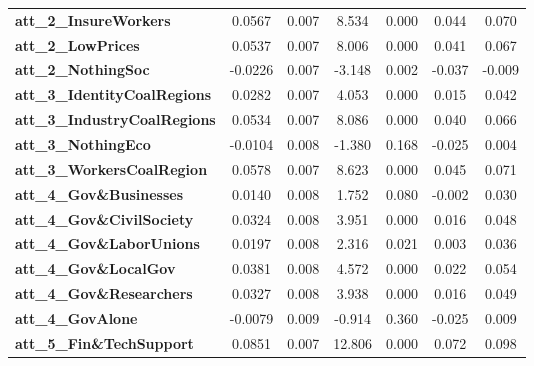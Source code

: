 \begin{center}
\begin{tabular}{lcccccc}
\textbf{att\_2\_InsureWorkers}       &       0.0567  &        0.007     &     8.534  &         0.000        &        0.044    &        0.070     \\
\textbf{att\_2\_LowPrices}           &       0.0537  &        0.007     &     8.006  &         0.000        &        0.041    &        0.067     \\
\textbf{att\_2\_NothingSoc}          &      -0.0226  &        0.007     &    -3.148  &         0.002        &       -0.037    &       -0.009     \\
\textbf{att\_3\_IdentityCoalRegions} &       0.0282  &        0.007     &     4.053  &         0.000        &        0.015    &        0.042     \\
\textbf{att\_3\_IndustryCoalRegions} &       0.0534  &        0.007     &     8.086  &         0.000        &        0.040    &        0.066     \\
\textbf{att\_3\_NothingEco}          &      -0.0104  &        0.008     &    -1.380  &         0.168        &       -0.025    &        0.004     \\
\textbf{att\_3\_WorkersCoalRegion}   &       0.0578  &        0.007     &     8.623  &         0.000        &        0.045    &        0.071     \\
\textbf{att\_4\_Gov\&Businesses}     &       0.0140  &        0.008     &     1.752  &         0.080        &       -0.002    &        0.030     \\
\textbf{att\_4\_Gov\&CivilSociety}   &       0.0324  &        0.008     &     3.951  &         0.000        &        0.016    &        0.048     \\
\textbf{att\_4\_Gov\&LaborUnions}    &       0.0197  &        0.008     &     2.316  &         0.021        &        0.003    &        0.036     \\
\textbf{att\_4\_Gov\&LocalGov}       &       0.0381  &        0.008     &     4.572  &         0.000        &        0.022    &        0.054     \\
\textbf{att\_4\_Gov\&Researchers}    &       0.0327  &        0.008     &     3.938  &         0.000        &        0.016    &        0.049     \\
\textbf{att\_4\_GovAlone}            &      -0.0079  &        0.009     &    -0.914  &         0.360        &       -0.025    &        0.009     \\
\textbf{att\_5\_Fin\&TechSupport}    &       0.0851  &        0.007     &    12.806  &         0.000        &        0.072    &        0.098     \\

\end{tabular}
\end{center}
